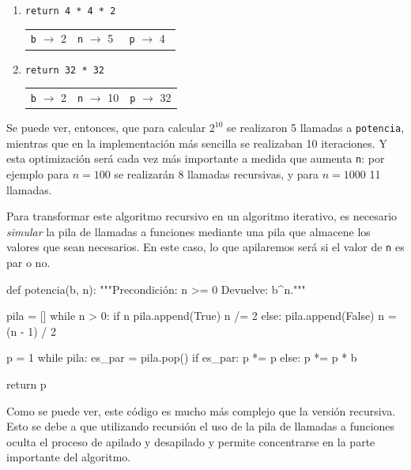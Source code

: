 \begin{enumerate}
\item \hspace{2cm} \verb!return 4 * 4 * 2   !
\hspace{3cm} \begin{tabular}{|c|c|c|}\verb|b| $\rightarrow$ 2 & \verb|n| $\rightarrow$ 5$\;\,$
& \verb|p| $\rightarrow$ 4$\;\,$ \end{tabular}
\item \hspace{1cm} \verb!return 32 * 32     !
\hspace{4cm} \begin{tabular}{|c|c|c|}\verb|b| $\rightarrow$ 2 & \verb|n| $\rightarrow$ 10
& \verb|p| $\rightarrow$ 32 \end{tabular}
\end{enumerate}

Se puede ver, entonces, que para calcular $2^{10}$ se realizaron 5 llamadas a
\lstinline!potencia!, mientras que en la implementación más sencilla se
realizaban 10 iteraciones. Y esta optimización será cada vez más importante
a medida que aumenta \lstinline!n!: por ejemplo para $n = 100$ se
realizarán 8 llamadas recursivas, y para $n = 1000$ 11 llamadas.


Para transformar este algoritmo recursivo en un algoritmo iterativo, es
necesario {\it simular} la pila de llamadas a funciones mediante una pila que
almacene los valores que sean necesarios.  En este caso, lo que apilaremos será
si el valor de \lstinline!n! es par o no.

\begin{codigo-python-sn}
def potencia(b, n):
    """Precondición: n >= 0
       Devuelve: b^n."""

    pila = []
    while n > 0:
        if n %
            pila.append(True)
            n /= 2
        else:
            pila.append(False)
            n = (n - 1) / 2

    p = 1
    while pila:
        es_par = pila.pop()
        if es_par:
            p *= p
        else:
            p *= p * b

    return p
\end{codigo-python-sn}

Como se puede ver, este código es mucho más complejo que la versión recursiva.
Esto se debe a que utilizando recursión el uso de la pila de llamadas a
funciones oculta el proceso de apilado y desapilado y permite concentrarse
en la parte importante del algoritmo.

